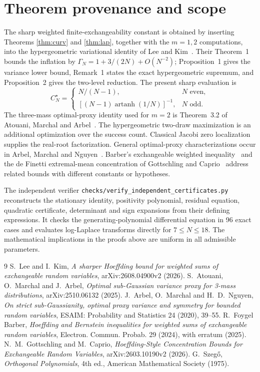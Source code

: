 \documentclass[11pt,a4paper]{article}
\begin{document}
\section{Theorem provenance and scope}
The sharp weighted finite-exchangeability constant is obtained by inserting Theorems \ref{thm:curv} and \ref{thm:lap}, together with the $m=1,2$ computations, into the hypergeometric variational identity of Lee and Kim~\cite{LeeKim}. Their Theorem~1 bounds the inflation by $\Gamma_N=1+3/(2N)+O(N^{-2})$; Proposition~1 gives the variance lower bound, Remark~1 states the exact hypergeometric supremum, and Proposition~2 gives the two-level reduction. The present sharp evaluation is
\[
 C_N^\star=\begin{cases}
 N/(N-1),&N\text{ even},\\[3pt]
 [(N-1)\operatorname{artanh}(1/N)]^{-1},&N\text{ odd}.
 \end{cases}
\]
The three-mass optimal-proxy identity used for $m=2$ is Theorem~3.2 of Atouani, Marchal and Arbel~\cite{AMA}. The hypergeometric two-draw maximization is an additional optimization over the success count. Classical Jacobi zero localization~\cite{Szego} supplies the real-root factorization. General optimal-proxy characterizations occur in Arbel, Marchal and Nguyen~\cite{AMN}. Barber's exchangeable weighted inequality~\cite{Barber} and the de Finetti extremal-mean concentration of Gottschling and Caprio~\cite{GC} address related bounds with different constants or hypotheses.

The independent verifier \texttt{checks/verify\_independent\_certificates.py} reconstructs the stationary identity, positivity polynomial, residual equation, quadratic certificate, determinant and sign expansions from their defining expressions. It checks the generating-polynomial differential equation in 96 exact cases and evaluates log-Laplace transforms directly for $7\le N\le18$. The mathematical implications in the proofs above are uniform in all admissible parameters.

\begin{thebibliography}{9}
 S.~Lee and I.~Kim, \emph{A sharper Hoeffding bound for weighted sums of exchangeable random variables}, arXiv:2608.04900v2 (2026).
 S.~Atouani, O.~Marchal and J.~Arbel, \emph{Optimal sub-Gaussian variance proxy for 3-mass distributions}, arXiv:2510.06132 (2025).
 J.~Arbel, O.~Marchal and H.~D.~Nguyen, \emph{On strict sub-Gaussianity, optimal proxy variance and symmetry for bounded random variables}, ESAIM: Probability and Statistics 24 (2020), 39--55.
 R.~Foygel Barber, \emph{Hoeffding and Bernstein inequalities for weighted sums of exchangeable random variables}, Electron. Commun. Probab. 29 (2024), with erratum (2025).
 N.~M.~Gottschling and M.~Caprio, \emph{Hoeffding-Style Concentration Bounds for Exchangeable Random Variables}, arXiv:2603.10190v2 (2026).
 G.~Szeg\H{o}, \emph{Orthogonal Polynomials}, 4th ed., American Mathematical Society (1975).
\end{thebibliography}
\end{document}
